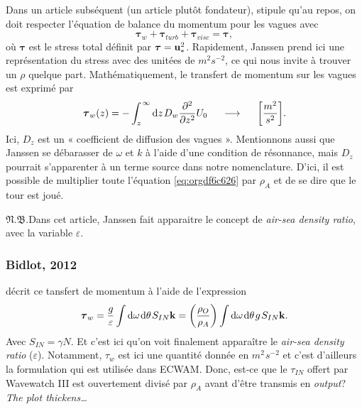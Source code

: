 \documentclass[10pt]{article}
\numberwithin{equation}{section}
\newcommand{\uu}{\vb{u}}
\newcommand{\pt}{\hspace{1pt}} %
\newcommand{\nb}{\underline{{\footnotesize\EightStarConvex}\pt $\mathfrak{N.B.}$\vphantom{p}}\hspace{3pt}}
\begin{document}
Dans un article subséquent (un article plutôt fondateur), \textcite[voir eq. 7 et 8 de l'article]{janssen_1991}  stipule qu'au repos, on doit respecter l'équation de balance du momentum pour les vagues avec
\begin{equation}
\label{eq:orgdf6c626}
   \boldsymbol{\tau}_w + \boldsymbol{\tau}_{turb} + \boldsymbol{\tau}_{visc}  = \boldsymbol{\tau},
\end{equation}
où \(\boldsymbol{\tau}\) est le stress total définit par \(\boldsymbol{\tau} = \uu_*^2\).
Rapidement, Janssen prend ici une représentation du stress avec des unitées de \(m^{2} s^{-2}\), ce qui nous invite à trouver un \(\rho\) quelque part.
Mathématiquement, le transfert de momentum sur les vagues est exprimé par
\begin{equation}
   \boldsymbol{\tau}_w(z) = - \int_z^{\pt\infty} \mathrm{d}z\pt D_w \pdv[2]{}{z} U_0 \hspace{0.5cm} \longrightarrow \hspace{0.5cm} \qty[\frac{m^2}{s^2}].
\end{equation}
Ici, \(D_z\) est un « coefficient de diffusion des vagues ».
Mentionnons aussi que Janssen se débarasser de \(\omega\) et \(k\) à l'aide d'une condition de résonnance, mais \(D_z\) pourrait s'apparenter à un terme source dans notre nomenclature.
D'ici, il est possible de multiplier toute l'équation \ref{eq:orgdf6c626} par \(\rho_A\) et de se dire que le tour est joué.\bigskip

\nb Dans cet article, Janssen fait apparaitre le concept de \emph{air-sea density ratio}, avec la variable \(\varepsilon\).


\subsubsection{Bidlot, 2012}
\label{sec:org67b2b4d}

\Textcite[voir eq. 6 de l'article]{bidlot2012present} décrit ce tansfert de momentum à l'aide de l'expression
\begin{equation}
   \boldsymbol{\tau}_w = \frac{g}{\varepsilon} \int \mathrm{d}\omega\pt \mathrm{d}\theta\pt S_{IN} \vb{k} = \qty(\frac{\rho_O}{\rho_A}) \int \mathrm{d}\omega\pt \mathrm{d}\theta\pt g\pt S_{IN} \vb{k}.
\end{equation}
Avec \(S_{IN} = \gamma N\).
Et c'est ici qu'on voit finalement apparaître le \emph{air-sea density ratio} (\(\varepsilon\)).
Notamment, \(\tau_w\) est ici une quantité donnée en \(m^2\pt s^{-2}\) et c'est d'ailleurs la formulation qui est utilisée dans ECWAM.
Donc, est-ce que le \(\tau_{IN}\) offert par Wavewatch III est ouvertement divisé par \(\rho_A\) avant d'être transmis en \emph{output}?
\emph{The plot thickens\ldots{}}
\end{document}
